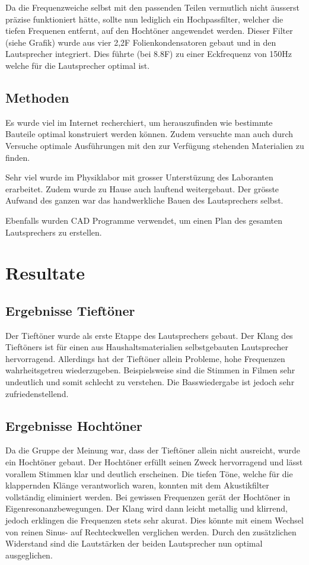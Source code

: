 \documentclass[a4paper,11pt]{report}
\begin{document}
Da die Frequenzweiche selbst mit den passenden Teilen vermutlich nicht äusserst präzise funktioniert hätte, sollte nun lediglich ein Hochpassfilter, welcher die tiefen Frequenen entfernt, auf den Hochtöner angewendet werden. Dieser Filter (siehe Grafik) wurde aus vier 2,2\mu F Folienkondensatoren gebaut und in den Lautsprecher integriert. Dies führte (bei 8.8\mu F) zu einer Eckfrequenz von 150Hz welche für die Lautsprecher optimal ist. 


\section{Methoden}
Es wurde viel im Internet recherchiert, um herauszufinden wie bestimmte Bauteile optimal konstruiert werden können. Zudem versuchte man auch durch Versuche optimale Ausführungen mit den zur Verfügung stehenden Materialien zu finden.

Sehr viel wurde im Physiklabor mit grosser Unterstüzung des Laboranten erarbeitet. Zudem wurde zu Hause auch lauftend weitergebaut. Der grösste Aufwand des ganzen war das handwerkliche Bauen des Lautsprechers selbst.

Ebenfalls wurden CAD Programme verwendet, um einen Plan des gesamten Lautsprechers zu erstellen.

\chapter{Resultate}

\section{Ergebnisse Tieftöner}
Der Tieftöner wurde als erste Etappe des Lautsprechers gebaut. Der Klang des Tieftöners ist für einen aus Haushaltsmaterialien selbstgebauten Lautsprecher hervorragend. Allerdings hat der Tieftöner allein Probleme, hohe Frequenzen wahrheitsgetreu wiederzugeben. Beispielsweise sind die Stimmen in Filmen sehr undeutlich und somit schlecht zu verstehen. Die Basswiedergabe ist jedoch sehr zufriedenstellend.

\section{Ergebnisse Hochtöner}
Da die Gruppe der Meinung war, dass der Tieftöner allein nicht ausreicht, wurde ein Hochtöner gebaut. Der Hochtöner erfüllt seinen Zweck hervorragend und lässt vorallem Stimmen klar und deutlich erscheinen. Die tiefen Töne, welche für die klappernden Klänge verantworlich waren, konnten mit dem Akustikfilter vollständig eliminiert werden. Bei gewissen Frequenzen gerät der Hochtöner in Eigenresonanzbewegungen. Der Klang wird dann leicht metallig und klirrend, jedoch erklingen die Frequenzen stets sehr akurat. Dies könnte mit einem Wechsel von reinen Sinus- auf Rechteckwellen verglichen werden. Durch den zusätzlichen Widerstand sind die Lautstärken der beiden Lautsprecher nun optimal ausgeglichen.
\end{document}
